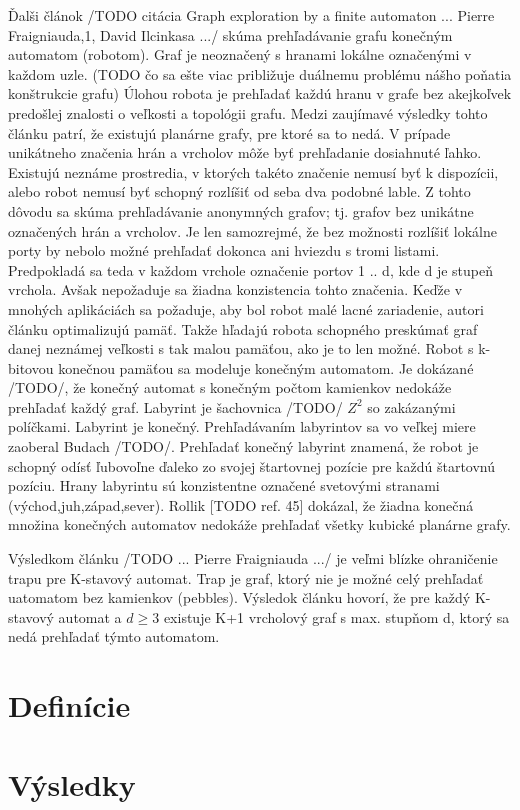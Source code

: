 Ďalši článok /TODO citácia Graph exploration by a finite automaton ... Pierre Fraigniauda,1, David Ilcinkasa .../
skúma prehľadávanie grafu konečným automatom (robotom). Graf je neoznačený s hranami lokálne označenými v každom uzle.
(TODO čo sa ešte viac približuje duálnemu problému nášho poňatia konštrukcie grafu)
Úlohou robota je prehľadať každú hranu v grafe bez akejkoľvek predošlej znalosti o veľkosti a topológii grafu. Medzi zaujímavé výsledky tohto článku patrí, že existujú planárne grafy, pre ktoré sa to nedá.
V prípade unikátneho značenia hrán a vrcholov môže byť prehľadanie dosiahnuté ľahko. Existujú neznáme prostredia, v ktorých takéto značenie nemusí byť k dispozícii, alebo robot nemusí byť schopný rozlíšiť od seba dva podobné lable. Z tohto dôvodu sa skúma prehľadávanie anonymných grafov; tj. grafov bez unikátne označených hrán a vrcholov.
Je len samozrejmé, že bez možnosti rozlíšiť lokálne porty by nebolo možné prehľadať dokonca ani hviezdu s tromi listami.
Predpokladá sa teda v každom vrchole označenie portov 1 .. d, kde d je stupeň vrchola. Avšak nepožaduje sa žiadna konzistencia tohto značenia. Keďže v mnohých aplikáciách sa požaduje, aby bol robot malé lacné zariadenie, autori článku optimalizujú pamäť. Takže hľadajú robota schopného preskúmať graf danej neznámej veľkosti s tak malou pamäťou, ako je to len možné. Robot s k-bitovou konečnou pamäťou sa modeluje konečným automatom. Je dokázané /TODO/, že konečný automat s konečným počtom kamienkov nedokáže prehľadať každý graf.
\newline
Labyrint je šachovnica /TODO/ $Z^2$ so zakázanými políčkami. Labyrint je konečný. Prehľadávaním labyrintov sa vo veľkej miere zaoberal 
Budach /TODO/.
Prehľadať konečný labyrint znamená, že robot je schopný odísť ľubovoľne ďaleko zo svojej štartovnej pozície pre každú štartovnú pozíciu. Hrany labyrintu sú konzistentne označené svetovými stranami (východ,juh,západ,sever).
Rollik [TODO ref. 45] dokázal, že žiadna konečná množina konečných automatov nedokáže prehľadať všetky kubické planárne grafy.

Výsledkom článku /TODO ... Pierre Fraigniauda .../ je veľmi blízke ohraničenie trapu pre K-stavový automat. Trap je graf, ktorý nie je možné celý prehľadať uatomatom bez kamienkov (pebbles). Výsledok článku hovorí, že pre každý K-stavový automat a $d\geq 3$ existuje K+1 vrcholový graf s max. stupňom d, ktorý sa nedá prehľadať týmto automatom.
\section{Definície}
\section{Výsledky}